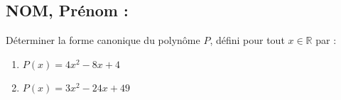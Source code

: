 \documentclass[a4paper,11pt,exos]{nsi} %
\begin{document}
\subsection*{NOM, Prénom : \dotfill} 


\maketitle




\begin{exercice}
Déterminer la forme canonique du polynôme $P$, défini pour tout $x \in \mathbb{R}$ par : 
\begin{multicols}{2}
    \begin{enumerate}
        \item $P(x)=4x^2-8x+4$
        \item $P(x)=3x^2-24x+49$
    \end{enumerate}
\end{multicols}
\end{exercice}

\end{document}
